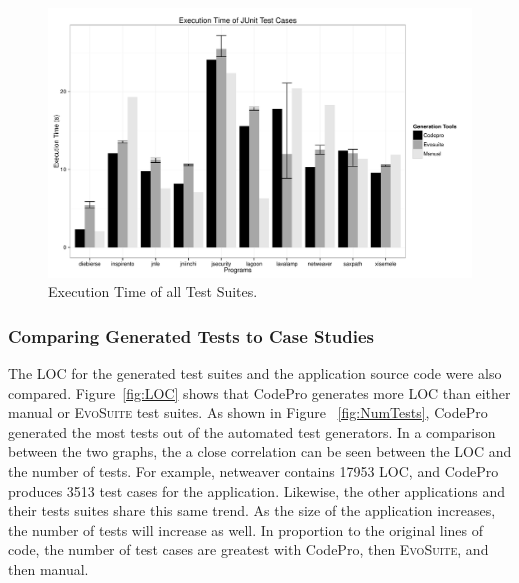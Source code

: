 \begin{figure}[!t]
\centering
  \includegraphics[scale=0.5]{RGraphs/TestExecutionTime.pdf}
    \caption{Execution Time of all Test Suites.}
  \label{fig:TestExecTime}
\end{figure}

\subsubsection{Comparing Generated Tests to Case Studies}



The LOC for the generated test suites and the application source code were also compared. Figure~\ref{fig:LOC} shows that CodePro generates more LOC than either manual or \textsc{EvoSuite} test suites. As shown in Figure ~\ref{fig:NumTests}, CodePro generated the most tests out of the automated test generators. In a comparison between the two graphs, the a close correlation can be seen between the LOC and the number of tests. For example, netweaver contains 17953 LOC, and CodePro produces 3513 test cases for the application. Likewise, the other applications and their tests suites share this same trend. As the size of the application increases, the number of tests will increase as well. In proportion to the original lines of code, the number of test cases are greatest with CodePro, then \textsc{EvoSuite}, and then manual. 
 
